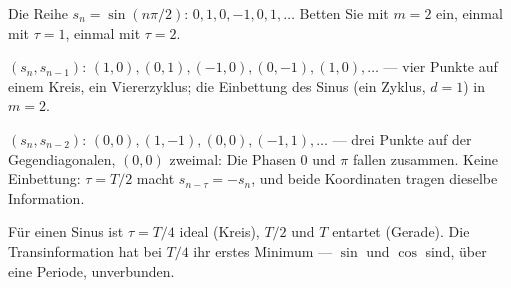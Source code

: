 \begin{aufgabe}
Die Reihe $s_n = \sin(n\pi/2)$: $0, 1, 0, -1, 0, 1, \ldots$ Betten Sie mit $m = 2$ ein, einmal mit $\tau = 1$, einmal mit $\tau = 2$.

\loesung
{}
$(s_n, s_{n-1})$: $(1,0), (0,1), (-1,0), (0,-1), (1,0), \ldots$ --- vier Punkte auf einem Kreis, ein Viererzyklus; die Einbettung des Sinus (ein Zyklus, $d = 1$) in $m = 2$. \checkmark

$(s_n, s_{n-2})$: $(0,0), (1,-1), (0,0), (-1,1), \ldots$ --- drei Punkte auf der Gegendiagonalen, $(0,0)$ zweimal: Die Phasen $0$ und $\pi$ fallen zusammen. Keine Einbettung: $\tau = T/2$ macht $s_{n-\tau} = -s_n$, und beide Koordinaten tragen dieselbe Information.

Für einen Sinus ist $\tau = T/4$ ideal (Kreis), $T/2$ und $T$ entartet (Gerade). Die Transinformation hat bei $T/4$ ihr erstes Minimum --- $\sin$ und $\cos$ sind, über eine Periode, unverbunden. \checkmark

\begin{center}
\begin{minipage}{0.88\textwidth}
\end{minipage}
\end{center}
\end{aufgabe}

